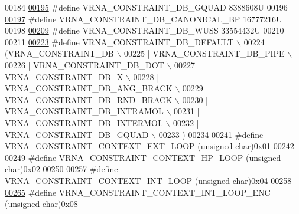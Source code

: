 \begin{DoxyCode}
00184 
\mbox{\hyperlink{group__hard__constraints_ga75cfab03cdc97c95b3ce8bb29f52b08e}{00195}} \textcolor{preprocessor}{#define VRNA\_CONSTRAINT\_DB\_GQUAD                8388608U}
00196 
\mbox{\hyperlink{constraints__hard_8h_a10fadeec2d291a851fe2197051cf842c}{00197}} \textcolor{preprocessor}{#define VRNA\_CONSTRAINT\_DB\_CANONICAL\_BP         16777216U}
00198 
\mbox{\hyperlink{group__hard__constraints_ga10ce6bd2355945f3c8161b7a30a2c322}{00209}} \textcolor{preprocessor}{#define VRNA\_CONSTRAINT\_DB\_WUSS                 33554432U}
00210 
00211 
\mbox{\hyperlink{group__hard__constraints_ga1c3864bdc92147a4d93de2b1b4356177}{00223}} \textcolor{preprocessor}{#define VRNA\_CONSTRAINT\_DB\_DEFAULT \(\backslash\)}
00224 \textcolor{preprocessor}{  (VRNA\_CONSTRAINT\_DB \(\backslash\)}
00225 \textcolor{preprocessor}{   | VRNA\_CONSTRAINT\_DB\_PIPE \(\backslash\)}
00226 \textcolor{preprocessor}{   | VRNA\_CONSTRAINT\_DB\_DOT \(\backslash\)}
00227 \textcolor{preprocessor}{   | VRNA\_CONSTRAINT\_DB\_X \(\backslash\)}
00228 \textcolor{preprocessor}{   | VRNA\_CONSTRAINT\_DB\_ANG\_BRACK \(\backslash\)}
00229 \textcolor{preprocessor}{   | VRNA\_CONSTRAINT\_DB\_RND\_BRACK \(\backslash\)}
00230 \textcolor{preprocessor}{   | VRNA\_CONSTRAINT\_DB\_INTRAMOL \(\backslash\)}
00231 \textcolor{preprocessor}{   | VRNA\_CONSTRAINT\_DB\_INTERMOL \(\backslash\)}
00232 \textcolor{preprocessor}{   | VRNA\_CONSTRAINT\_DB\_GQUAD \(\backslash\)}
00233 \textcolor{preprocessor}{  )}
00234 
\mbox{\hyperlink{group__hard__constraints_ga9418eda62a5dec070896702c279d2548}{00241}} \textcolor{preprocessor}{#define VRNA\_CONSTRAINT\_CONTEXT\_EXT\_LOOP      (unsigned char)0x01}
00242 
\mbox{\hyperlink{group__hard__constraints_ga79203702b197b6b9d3b78eed40663eb1}{00249}} \textcolor{preprocessor}{#define VRNA\_CONSTRAINT\_CONTEXT\_HP\_LOOP       (unsigned char)0x02}
00250 
\mbox{\hyperlink{group__hard__constraints_ga21feeab3a9e5fa5a9e3d9ac0fcf5994f}{00257}} \textcolor{preprocessor}{#define VRNA\_CONSTRAINT\_CONTEXT\_INT\_LOOP      (unsigned char)0x04}
00258 
\mbox{\hyperlink{group__hard__constraints_ga0536288e04ff6332ecdc23ca4705402b}{00265}} \textcolor{preprocessor}{#define VRNA\_CONSTRAINT\_CONTEXT\_INT\_LOOP\_ENC  (unsigned char)0x08}

\end{DoxyCode}
